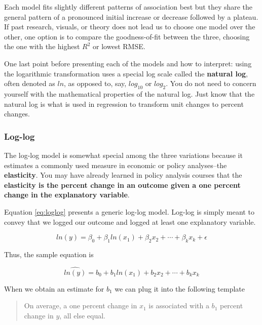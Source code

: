 \documentclass[
]{book}
\begin{document}
Each model fits slightly different patterns of association best but they share the general pattern of a pronounced initial increase or decrease followed by a plateau. If past research, visuals, or theory does not lead us to choose one model over the other, one option is to compare the goodness-of-fit between the three, choosing the one with the highest \(R^2\) or lowest RMSE.

One last point before presenting each of the models and how to interpret: using the logarithmic transformation uses a special log scale called the \textbf{natural log}, often denoted as \textbf{\(ln\)}, as opposed to, say, \(log_{10}\) or \(log_2\). You do not need to concern yourself with the mathematical properties of the natural log. Just know that the natural log is what is used in regression to transform unit changes to percent changes.

\hypertarget{log-log}{%
\subsubsection*{Log-log}\label{log-log}}


The log-log model is somewhat special among the three variations because it estimates a commonly used measure in economic or policy analyses--the \textbf{elasticity}. You may have already learned in policy analysis courses that the \textbf{elasticity is the percent change in an outcome given a one percent change in the explanatory variable}.

Equation \eqref{eq:loglog} presents a generic log-log model. Log-log is simply meant to convey that we logged our outcome and logged at least one explanatory variable.

\begin{equation}
ln(y)=\beta_0 + \beta_1ln(x_1) + \beta_2x_2 + \cdots + \beta_kx_k + \epsilon
\label{eq:loglog}
\end{equation}

Thus, the sample equation is

\begin{equation}
\hat{ln(y)}=b_0 + b_1ln(x_1) + b_2x_2 + \cdots + b_kx_k
\label{eq:loglogsamp}
\end{equation}

When we obtain an estimate for \(b_1\) we can plug it into the following template

\begin{quote}
On average, a one percent change in \(x_1\) is associated with a \(b_1\) percent change in \(y\), all else equal.
\end{quote}
\end{document}
